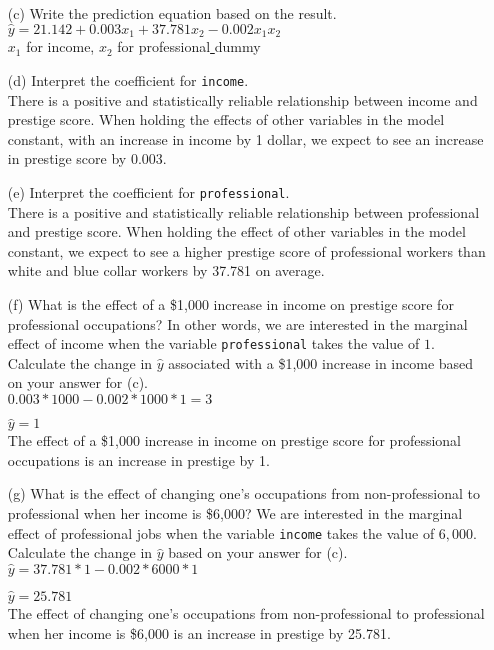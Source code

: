 \documentclass[12pt,letterpaper]{article}
\begin{document}
\begin{enumerate}
	\vspace{6cm}
	\item [(c)]
	Write the prediction equation based on the result.\\
	 $  \hat{y} = 21.142 +  0.003x_{1} + 37.781x_{2} -0.002x_{1}x_{2}  $\\		
	 $x_{1}$ for income, $x_{2}$  for  professional\underline{ }dummy 
	
\newpage
	\item [(d)]
	Interpret the coefficient for \texttt{income}.\\
	There is a positive and statistically reliable relationship between income and prestige score. When holding the effects of other variables in the model constant, with an increase in income by 1 dollar, we expect to see an increase in prestige score by 0.003.  
	
	\vspace{10cm}	
	\item [(e)]
	Interpret the coefficient for \texttt{professional}.\\
	There is a positive and statistically reliable relationship between professional and prestige score. When holding the effect of other variables in the model constant, we expect to see a higher prestige score of professional workers than white and blue collar workers by 37.781 on average.  
	
	\newpage
	\item [(f)]
	What is the effect of a \$1,000 increase in income on prestige score for professional occupations? In other words, we are interested in the marginal effect of income when the variable \texttt{professional} takes the value of $1$. Calculate the change in $\hat{y}$ associated with a \$1,000 increase in income based on your answer for (c).\\
	$ 0.003 * 1000 - 0.002*1000*1 = 3 $
	
	$\hat{y} = 1 $\\
	The effect of a \$1,000 increase in income on prestige score for professional occupations is an increase in prestige by 1.
	\vspace{10cm}
	
	
	\item [(g)]
	What is the effect of changing one's occupations from non-professional to professional when her income is \$6,000? We are interested in the marginal effect of professional jobs when the variable \texttt{income} takes the value of $6,000$. Calculate the change in $\hat{y}$ based on your answer for (c).\\
		$\hat{y} = 37.781 * 1 - 0.002 * 6000 *1 $
	
	$\hat{y} =  25.781 $\\
	The effect of changing one's occupations from non-professional to professional when her income is \$6,000 is an increase in prestige by 25.781.
	
	
\end{enumerate}
\end{document}
